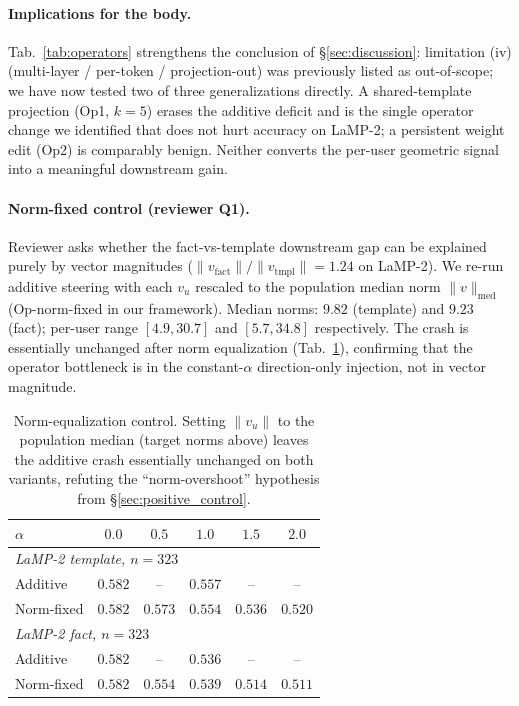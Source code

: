 \documentclass{article}
\begin{document}
\paragraph{Implications for the body.}  Tab.~\ref{tab:operators}
strengthens the conclusion of \S\ref{sec:discussion}: limitation
(iv) (multi-layer / per-token / projection-out) was previously
listed as out-of-scope; we have now tested two of three
generalizations directly.  A shared-template projection
(Op1, $k{=}5$) erases the additive deficit and is the single
operator change we identified that does not hurt accuracy on
LaMP-2; a persistent weight edit (Op2) is comparably benign.
Neither converts the per-user geometric signal into a meaningful
downstream gain.

\paragraph{Norm-fixed control (reviewer Q1).}
Reviewer asks whether the fact-vs-template downstream gap can be
explained purely by vector magnitudes ($\|v_{\text{fact}}\|/\|v_{\text{tmpl}}\|
{=}1.24$ on LaMP-2).  We re-run additive steering with each $v_u$
rescaled to the population median norm $\|v\|_{\text{med}}$ (Op-norm-fixed
in our framework).  Median norms: $9.82$ (template) and $9.23$
(fact); per-user range $[4.9, 30.7]$ and $[5.7, 34.8]$ respectively.
The crash is essentially unchanged after norm equalization
(Tab.~\ref{tab:normfixed}), confirming that the operator
bottleneck is in the constant-$\alpha$ direction-only injection,
not in vector magnitude.

\begin{table}[h]
\centering\small
\begin{tabular}{lccccc}
\toprule
$\alpha$ & $0.0$ & $0.5$ & $1.0$ & $1.5$ & $2.0$ \\
\midrule
\multicolumn{6}{l}{\emph{LaMP-2 template, $n{=}323$}}\\
Additive   & $0.582$ & --      & $0.557$ & --      & --      \\
Norm-fixed & $0.582$ & $0.573$ & $0.554$ & $0.536$ & $0.520$ \\
\midrule
\multicolumn{6}{l}{\emph{LaMP-2 fact, $n{=}323$}}\\
Additive   & $0.582$ & --      & $0.536$ & --      & --      \\
Norm-fixed & $0.582$ & $0.554$ & $0.539$ & $0.514$ & $0.511$ \\
\bottomrule
\end{tabular}
\caption{Norm-equalization control. Setting $\|v_u\|$ to the
population median (target norms above) leaves the additive crash
essentially unchanged on both variants, refuting the
``norm-overshoot'' hypothesis from \S\ref{sec:positive_control}.}
\label{tab:normfixed}
\end{table}
\end{document}
